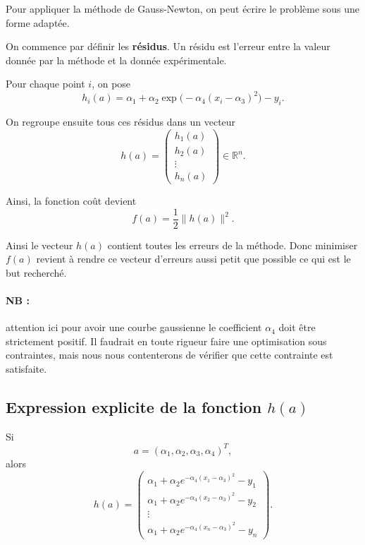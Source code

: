 \documentclass[a4paper,12pt]{article}
\begin{document}
	Pour appliquer la méthode de Gauss-Newton, on peut écrire le problème sous une forme adaptée.
	
	On commence par définir les \textbf{résidus}.
	Un résidu est l'erreur entre la valeur donnée par la méthode et la donnée expérimentale.
	
	Pour chaque point $i$, on pose
	\begin{equation}
	h_i(a)=\alpha_1+\alpha_2\exp\big(-\alpha_4(x_i-\alpha_3)^2\big)-y_i.
	\end{equation}
	
	On regroupe ensuite tous ces résidus dans un vecteur
	\begin{equation}
	h(a)=
	\begin{pmatrix}
	h_1(a)\\
	h_2(a)\\
	\vdots\\
	h_n(a)
	\end{pmatrix}
	\in\mathbb{R}^n.
	\end{equation}
	
	Ainsi, la fonction coût devient
	\begin{equation}
	f(a)=\frac12\|h(a)\|^2.
	\end{equation}
	
	Ainsi le vecteur $h(a)$ contient toutes les erreurs de la méthode.
	Donc minimiser $f(a)$ revient à rendre ce vecteur d'erreurs aussi petit que possible ce qui est le but recherché.
	
	\paragraph{NB :} attention ici pour avoir une courbe gaussienne le coefficient $\alpha_4$ doit être strictement positif. Il faudrait
	en toute rigueur faire une optimisation sous contraintes, mais nous nous contenterons de vérifier que cette
	contrainte est satisfaite.
	
	\subsection{Expression explicite de la fonction \texorpdfstring{$h(a)$}{h(a)}}
	
	Si
	\[
	a=(\alpha_1,\alpha_2,\alpha_3,\alpha_4)^T,
	\]
	alors
	\begin{equation}
	h(a)=
	\begin{pmatrix}
	\alpha_1+\alpha_2 e^{-\alpha_4(x_1-\alpha_3)^2}-y_1\\
	\alpha_1+\alpha_2 e^{-\alpha_4(x_2-\alpha_3)^2}-y_2\\
	\vdots\\
	\alpha_1+\alpha_2 e^{-\alpha_4(x_n-\alpha_3)^2}-y_n
	\end{pmatrix}.
	\end{equation}
	
\end{document}
